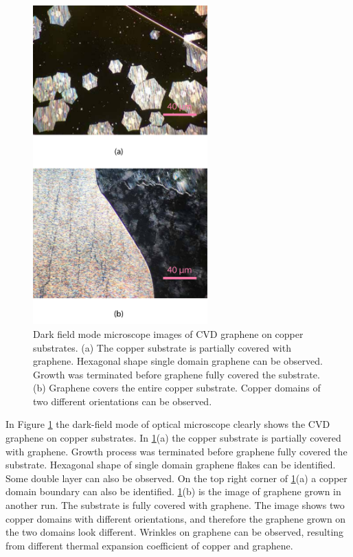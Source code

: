 \documentclass[pdflatex, sectionletters, 12pt]{pittetd}    %
\begin{document}
\begin{figure}[p]
	\centering
	\includegraphics[width=0.6\textwidth]{Drawing/CVDGraphene.pdf}
	\caption{Dark field mode microscope images of CVD graphene on copper substrates. (a) The copper substrate is partially covered with graphene. Hexagonal shape single domain graphene can be observed. Growth was terminated before graphene fully covered the substrate. (b) Graphene covers the entire copper substrate. Copper domains of two different orientations can be observed.}
	\label{FIG:CVDGraphene}
\end{figure}

In Figure \ref{FIG:CVDGraphene} the dark-field mode of optical microscope clearly shows the CVD graphene on copper substrates. In \ref{FIG:CVDGraphene}(a) the copper substrate is partially covered with graphene. Growth process was terminated before graphene fully covered the substrate. Hexagonal shape of single domain graphene flakes can be identified. Some double layer can also be observed. On the top right corner of \ref{FIG:CVDGraphene}(a) a copper domain boundary can also be identified. \ref{FIG:CVDGraphene}(b) is the image of graphene grown in another run. The substrate is fully covered with graphene. The image shows two copper domains with different orientations, and therefore the graphene grown on the two domains look different. Wrinkles on graphene can be observed, resulting from different thermal expansion coefficient of copper and graphene. 
\end{document}
